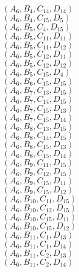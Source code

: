 \documentclass[14pt]{article}
\begin{document}
    $({A}_{6}, {B}_{4}, {C}_{14}, {D}_{14}) $ \\ 
    $({A}_{6}, {B}_{4}, {C}_{15}, {D}_{5}) $ \\ 
    $({A}_{6}, {B}_{5}, {C}_{4}, {D}_{15}) $ \\ 
    $({A}_{6}, {B}_{5}, {C}_{11}, {D}_{11}) $ \\ 
    $({A}_{6}, {B}_{5}, {C}_{11}, {D}_{12}) $ \\ 
    $({A}_{6}, {B}_{5}, {C}_{12}, {D}_{11}) $ \\ 
    $({A}_{6}, {B}_{5}, {C}_{12}, {D}_{12}) $ \\ 
    $({A}_{6}, {B}_{5}, {C}_{15}, {D}_{4}) $ \\ 
    $({A}_{6}, {B}_{6}, {C}_{15}, {D}_{15}) $ \\ 
    $({A}_{6}, {B}_{7}, {C}_{13}, {D}_{15}) $ \\ 
    $({A}_{6}, {B}_{7}, {C}_{14}, {D}_{15}) $ \\ 
    $({A}_{6}, {B}_{7}, {C}_{15}, {D}_{13}) $ \\ 
    $({A}_{6}, {B}_{7}, {C}_{15}, {D}_{14}) $ \\ 
    $({A}_{6}, {B}_{8}, {C}_{13}, {D}_{15}) $ \\ 
    $({A}_{6}, {B}_{8}, {C}_{14}, {D}_{15}) $ \\ 
    $({A}_{6}, {B}_{8}, {C}_{15}, {D}_{13}) $ \\ 
    $({A}_{6}, {B}_{8}, {C}_{15}, {D}_{14}) $ \\ 
    $({A}_{6}, {B}_{9}, {C}_{11}, {D}_{15}) $ \\ 
    $({A}_{6}, {B}_{9}, {C}_{12}, {D}_{15}) $ \\ 
    $({A}_{6}, {B}_{9}, {C}_{15}, {D}_{11}) $ \\ 
    $({A}_{6}, {B}_{9}, {C}_{15}, {D}_{12}) $ \\ 
    $({A}_{6}, {B}_{10}, {C}_{11}, {D}_{15}) $ \\ 
    $({A}_{6}, {B}_{10}, {C}_{12}, {D}_{15}) $ \\ 
    $({A}_{6}, {B}_{10}, {C}_{15}, {D}_{11}) $ \\ 
    $({A}_{6}, {B}_{10}, {C}_{15}, {D}_{12}) $ \\ 
    $({A}_{6}, {B}_{11}, {C}_{1}, {D}_{13}) $ \\ 
    $({A}_{6}, {B}_{11}, {C}_{1}, {D}_{14}) $ \\ 
    $({A}_{6}, {B}_{11}, {C}_{2}, {D}_{13}) $ \\ 
    $({A}_{6}, {B}_{11}, {C}_{2}, {D}_{14}) $ \\ 
\end{document}
